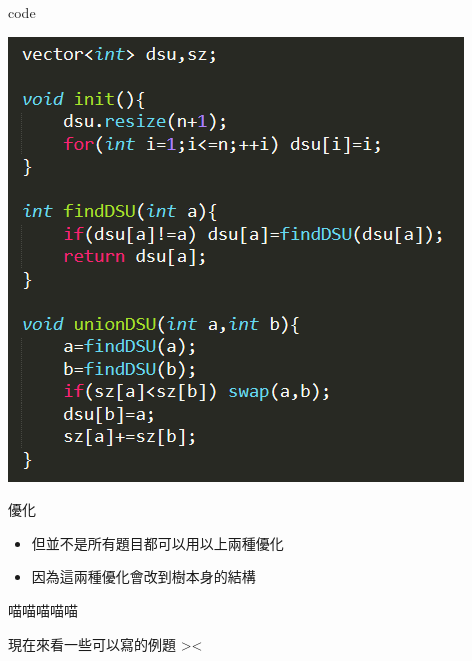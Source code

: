 \documentclass[aspectratio=169]{beamer}
\begin{document}
    \begin{frame}{code}
        \begin{center}
            \includegraphics[scale=0.6]{code/dsu_c_m.png}
        \end{center}
    \end{frame}
    \begin{frame}{優化}
        \begin{itemize}
            \item 但並不是所有題目都可以用以上兩種優化
            \item 因為這兩種優化會改到樹本身的結構
        \end{itemize}
    \end{frame}
    \begin{frame}{喵喵喵喵喵}
        \begin{center}
            現在來看一些可以寫的例題 ><
        \end{center}
    \end{frame}
\end{document}
